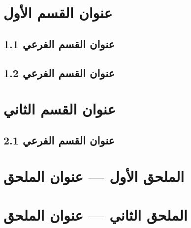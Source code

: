 \documentclass[11pt,a4paper]{article}
\begin{document}
\newpage

\section*{عنوان القسم الأول}


\subsection*{1.1 عنوان القسم الفرعي}


\subsection*{1.2 عنوان القسم الفرعي}


\newpage

\section*{عنوان القسم الثاني}


\subsection*{2.1 عنوان القسم الفرعي}


\newpage

\section*{الملحق الأول — عنوان الملحق}


\section*{الملحق الثاني — عنوان الملحق}

\end{document}
